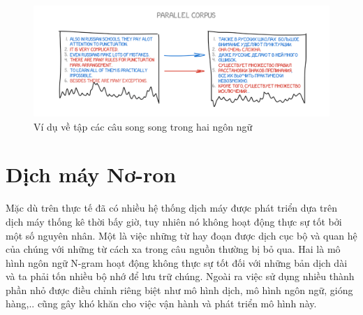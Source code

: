 \begin{figure}
	\centering
	\includegraphics[width=\textwidth]{smt}
	\caption[Ví dụ về tập các câu song song trong hai ngôn ngữ]{Ví dụ về tập các câu song song trong hai ngôn ngữ}
	\label{fig_intronmt}
\end{figure}



\section{Dịch máy Nơ-ron}

Mặc dù trên thực tế đã có nhiều hệ thống dịch máy được phát triển dựa trên dịch máy thống kê thời bấy giờ, tuy nhiên nó không hoạt động thực sự tốt bởi một số nguyên nhân. Một là việc những từ hay đoạn được dịch cục bộ và quan hệ của chúng với những từ cách xa trong câu nguồn thường bị bỏ qua. Hai là mô hình ngôn ngữ N-gram hoạt động không thực sự tốt đối với những bản dịch dài và ta phải tốn nhiều bộ nhớ để lưu trữ chúng. Ngoài ra việc sử dụng nhiều thành phần nhỏ được điều chỉnh riêng biệt như mô hình dịch, mô hình ngôn ngữ, gióng hàng,.. cũng gây khó khăn cho việc vận hành và phát triển mô hình này.

